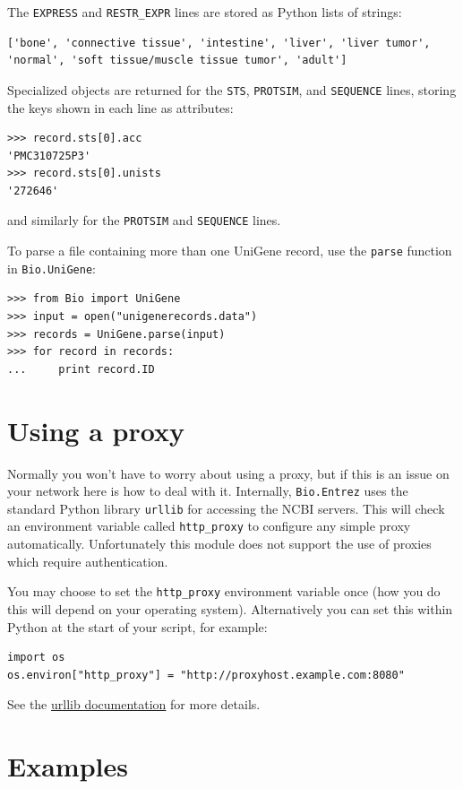 \documentclass{report}
\begin{document}
The \verb+EXPRESS+ and \verb+RESTR_EXPR+ lines are stored as Python lists of strings:
\begin{verbatim}
['bone', 'connective tissue', 'intestine', 'liver', 'liver tumor', 'normal', 'soft tissue/muscle tissue tumor', 'adult']
\end{verbatim}

Specialized objects are returned for the \verb+STS+, \verb+PROTSIM+, and \verb+SEQUENCE+ lines, storing the keys shown in each line as attributes:
\begin{verbatim}
>>> record.sts[0].acc
'PMC310725P3'
>>> record.sts[0].unists
'272646'
\end{verbatim}
and similarly for the \verb+PROTSIM+ and \verb+SEQUENCE+ lines.

To parse a file containing more than one UniGene record, use the \verb+parse+ function in \verb+Bio.UniGene+:

\begin{verbatim}
>>> from Bio import UniGene
>>> input = open("unigenerecords.data")
>>> records = UniGene.parse(input)
>>> for record in records:
...     print record.ID
\end{verbatim}

\section{Using a proxy}

Normally you won't have to worry about using a proxy, but if this is an issue
on your network here is how to deal with it.  Internally, \verb|Bio.Entrez|
uses the standard Python library \verb|urllib| for accessing the NCBI servers.
This will check an environment variable called \verb|http_proxy| to configure
any simple proxy automatically.  Unfortunately this module does not support
the use of proxies which require authentication.

You may choose to set the \verb|http_proxy| environment variable once (how you
do this will depend on your operating system).  Alternatively you can set this
within Python at the start of your script, for example:

\begin{verbatim}
import os
os.environ["http_proxy"] = "http://proxyhost.example.com:8080"
\end{verbatim}

\noindent See the \href{http://www.python.org/doc/lib/module-urllib.html}
{urllib documentation} for more details.

\section{Examples}
\label{sec:entrez_examples}
\end{document}
